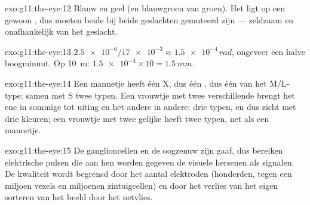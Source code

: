 \begin{solution}{exo:g11:the-eye:12}
Blauw en geel (en blauwgroen van groen). Het  ligt op een gewoon
, dus moeten beide  bij beide geslachten gemuteerd zijn
--- zeldzaam en onafhankelijk van het geslacht.
\end{solution}

\begin{solution}{exo:g11:the-eye:13}
$\num{2.5e-6}/\num{17e-3} \approx \num{1.5e-4}\,\unit{rad}$, ongeveer een
halve boogminuut. Op \qty{10}{m}: $\num{1.5e-4} \times 10 =
\qty{1.5}{mm}$.
\end{solution}

\begin{solution}{exo:g11:the-eye:14}
Een mannetje heeft één X, dus één , dus één  van het
M/L-type: samen met S twee typen. Een vrouwtje met twee verschillende
 brengt het ene in sommige  tot uiting en het andere in
andere: drie typen, en dus zicht met drie kleuren; een vrouwtje met twee
gelijke  heeft twee typen, net als een mannetje.
\end{solution}

\begin{solution}{exo:g11:the-eye:15}
De ganglioncellen en de oogzenuw zijn gaaf, dus bereiken elektrische
pulsen die aan hen worden gegeven de visuele hersenen als signalen. De
kwaliteit wordt begrensd door het aantal elektroden (honderden, tegen een
miljoen vezels en miljoenen zintuigcellen) en door het verlies van het
eigen sorteren van het beeld door het netvlies.
\end{solution}

